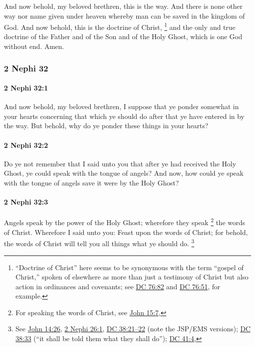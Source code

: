 			And now behold, my beloved brethren, this is the way.
			And there is none other way nor name given under heaven
			whereby man can be saved in the kingdom of God.
			And now behold, this is the doctrine of Christ,%
				\footnote{%
					``Doctrine of Christ'' here seems to be synonymous with the term ``gospel of Christ,'' spoken of elsewhere as more than just a testimony of Christ but also action in ordinances and covenants; see \hyperref[DC76-82]{DC 76:82} and \hyperref[DC76-51]{DC 76:51}, for example.
					}
			and the only and true doctrine of the Father and of the Son and of the Holy Ghost,
			which is one God without end.
			Amen.

	\subsubsection{2 Nephi 32} %
		\label{2NEPHI-32}
		
		\paragraph{2 Nephi 32:1} %
			\label{2NEPHI-32-1}

			And now behold, my beloved brethren,
			I suppose that ye ponder somewhat in your hearts
			concerning that which ye should do
			after that ye have entered in by the way.
			But behold, why do ye ponder these things in your hearts?

		\paragraph{2 Nephi 32:2} %
			\label{2NEPHI-32-2}

			Do ye not remember that I said unto you
			that after ye had received the Holy Ghost,
			ye could speak with the tongue of angels?
			And now, how could ye speak with the tongue of angels
			save it were by the Holy Ghost?

		\paragraph{2 Nephi 32:3} %
			\label{2NEPHI-32-3}

			Angels speak by the power of the Holy Ghost;
			wherefore they speak%
				\footnote{%
					For speaking the words of Christ, see \hyperref[JOHN-15-7]{John 15:7},
					}
			the words of Christ.
			Wherefore I said unto you:
			Feast upon the words of Christ;
			for behold, the words of Christ will tell you all things what ye should do.%
				\footnote{%
					See \hyperref[JOHN-14-26]{John 14:26}, \hyperref[2NEPHI-26-1]{2 Nephi 26:1}, \hyperref[DC38-21]{DC 38:21--22} (note the JSP/EMS versions); \hyperref[DC38-33]{DC 38:33} (``it shall be told them what they shall do''); \hyperref[DC41-4]{DC 41:4},
					}

